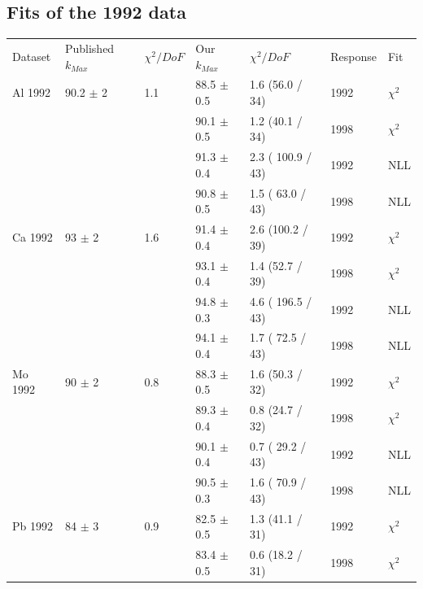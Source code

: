 \subsection { Fits of the 1992 data }
\begin{table}[h]
  \begin{center}
    \begin{tabular}{|l||l|l|l|l|l|l|}
      \hline
      Dataset & Published $k_{Max}$ & $\chi^2 / DoF$ & Our $k_{Max}$ & $\chi^2 / DoF$  & Response & Fit \\
      \hhline{|=||=|=|=|=|=|=|}
       Al 1992   & 90.2 $\pm$ 2   & 1.1 & 88.5 $\pm$ 0.5 &  1.6 (56.0 / 34) & 1992 & $\chi^2$ \\  
                 &                &     & 90.1 $\pm$ 0.5 &  1.2 (40.1 / 34) & 1998 & $\chi^2$ \\  
                                                                             
                 &                &     & 91.3 $\pm$ 0.4 & 2.3 ( 100.9 / 43)& 1992 & NLL \\
                 &                &     & 90.8 $\pm$ 0.5 & 1.5 ( 63.0 / 43) & 1998 & NLL \\
       \hline                                                                
       Ca 1992   & 93   $\pm$ 2   & 1.6 & 91.4 $\pm$ 0.4 &  2.6 (100.2 / 39)& 1992 & $\chi^2$ \\  
                 &                &     & 93.1 $\pm$ 0.4 &  1.4 (52.7 / 39) & 1998 & $\chi^2$ \\  
                                                                             
                 &                &     & 94.8 $\pm$ 0.3 & 4.6 ( 196.5 / 43)& 1992 & NLL \\
                 &                &     & 94.1 $\pm$ 0.4 & 1.7 ( 72.5 / 43) & 1998 & NLL \\
      \hline                                                                 
       Mo 1992   & 90   $\pm$ 2   & 0.8 & 88.3 $\pm$ 0.5 &  1.6 (50.3 / 32) & 1992 & $\chi^2$ \\  
                 &                &     & 89.3 $\pm$ 0.4 &  0.8 (24.7 / 32) & 1998 & $\chi^2$ \\  
                                                                             
                 &                &     & 90.1 $\pm$ 0.4 & 0.7 ( 29.2 / 43) & 1992 & NLL \\
                 &                &     & 90.5 $\pm$ 0.3 & 1.6 ( 70.9 / 43) & 1998 & NLL \\
      \hline                                                                 
       Pb 1992   & 84   $\pm$ 3   & 0.9 & 82.5 $\pm$ 0.5 &  1.3 (41.1 / 31) & 1992 & $\chi^2$ \\  
                 &                &     & 83.4 $\pm$ 0.5 &  0.6 (18.2 / 31) & 1998 & $\chi^2$ \\  
                                                                             

\end{tabular}
\end{center}
\end{table}
